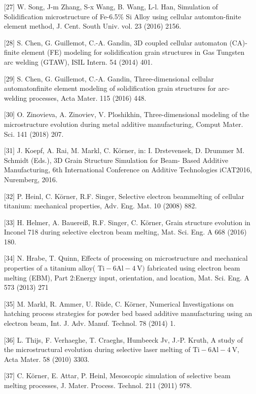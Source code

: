 \documentclass[10pt]{article}
\begin{document}
[27] W. Song, J-m Zhang, S-x Wang, B. Wang, L-l. Han, Simulation of Solidification microstructure of Fe-6.5\% Si Alloy using cellular automton-finite element method, J. Cent. South Univ. vol. 23 (2016) 2156.

[28] S. Chen, G. Guillemot, C.-A. Gandin, 3D coupled cellular automaton (CA)- finite element (FE) modeling for solidification grain structures in Gas Tungsten arc welding (GTAW), ISIL Intern. 54 (2014) 401.

[29] S. Chen, G. Guillemot, C.-A. Gandin, Three-dimensional cellular automatonfinite element modeling of solidification grain structures for arc-welding processes, Acta Mater. 115 (2016) 448.

[30] O. Zinovieva, A. Zinoviev, V. Ploshikhin, Three-dimensional modeling of the microstructure evolution during metal additive manufacturing, Comput Mater. Sci. 141 (2018) 207.

[31] J. Koepf, A. Rai, M. Markl, C. Körner, in: I. Drstevensek, D. Drummer M. Schmidt (Eds.), 3D Grain Structure Simulation for Beam- Based Additive Manufacturing, 6th International Conference on Additive Technologies iCAT2016, Nuremberg, 2016.

[32] P. Heinl, C. Körner, R.F. Singer, Selective electron beammelting of cellular titanium: mechanical properties, Adv. Eng. Mat. 10 (2008) 882.

[33] H. Helmer, A. Bauereiß, R.F. Singer, C. Körner, Grain structure evolution in Inconel 718 during selective electron beam melting, Mat. Sci. Eng. A 668 (2016) 180.

[34] N. Hrabe, T. Quinn, Effects of processing on microstructure and mechanical properties of a titanium alloy( $\mathrm{Ti}-6 \mathrm{Al}-4 \mathrm{~V})$ fabricated using electron beam melting (EBM), Part 2:Energy input, orientation, and location, Mat. Sci. Eng. A 573 (2013) 271

[35] M. Markl, R. Ammer, U. Rüde, C. Körner, Numerical Investigations on hatching process strategies for powder bed based additive manufacturing using an electron beam, Int. J. Adv. Manuf. Technol. 78 (2014) 1.

[36] L. Thijs, F. Verhaeghe, T. Craeghs, Humbeeck Jv, J.-P. Kruth, A study of the microstructural evolution during selective laser melting of $\mathrm{Ti}-6 \mathrm{Al}-4 \mathrm{~V}$, Acta Mater. 58 (2010) 3303.

[37] C. Körner, E. Attar, P. Heinl, Mesoscopic simulation of selective beam melting processes, J. Mater. Process. Technol. 211 (2011) 978.
\end{document}
